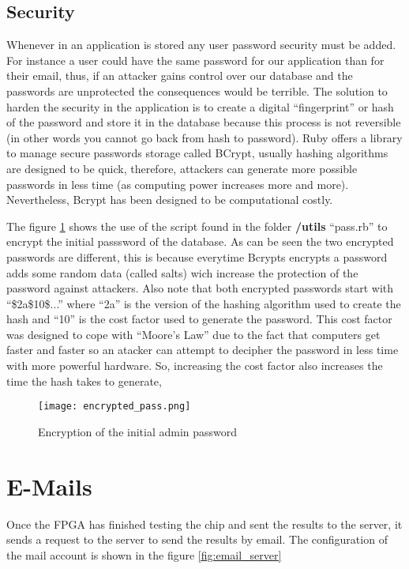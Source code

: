 \subsection{Security}

Whenever in an application is stored any user password security must be added. For instance a user could have the same password for our application than for their email, thus, if an attacker gains control over our database and the passwords are unprotected the consequences would be
terrible. The solution to harden the security in the application is to create a digital ``fingerprint'' or hash of the password and store it in the database because this process is not reversible (in other words you cannot go back from hash to password).
Ruby offers a library to manage secure passwords storage called BCrypt, usually hashing algorithms are designed to be quick, therefore, attackers can generate more possible passwords in less time (as computing power increases more and more). Nevertheless, Bcrypt has been designed to
be computational costly.

The figure \ref{fig:initial_pass} shows the use of the script found in the folder {\bf /utils} ``pass.rb'' to encrypt the initial passsword of the database. As can be seen the two encrypted passwords are different, this is because everytime Bcrypts encrypts a password adds some random data
(called salts) wich increase the protection of the password against attackers. Also note that both encrypted passwords start with ``\$2a\$10\$...'' where ``2a'' is the version of the hashing algorithm used to create the hash and ``10'' is the cost factor used to generate the password. This cost factor
was designed to cope with ``Moore's Law'' due to the fact that computers get faster and faster so an atacker can attempt to decipher the password in less time with more powerful hardware. So, increasing the cost factor also increases the time the hash takes to generate,

\begin{figure}[htb]
\centering
\texttt{[image: encrypted\_pass.png]}
\caption{Encryption of the initial admin password}
\label{fig:initial_pass}
\end{figure}


\section{E-Mails}

Once the FPGA has finished testing the chip and sent the results to the server, it sends a request to the server to send the results by email. The configuration of the mail account is shown in the figure \ref{fig:email_server}

